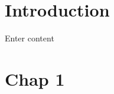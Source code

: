 \documentclass[12pt]{article}
\begin{document}

 
\newpage

\section{Introduction}

Enter content

\section{Chap 1}
\end{document}
